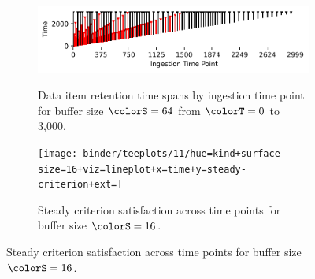 \begin{figure}[h!]
   \begin{minipage}[]{\textwidth}
   \vspace{-2pt}
  \begin{subfigure}[t]{0.7\linewidth}
  \vspace{0pt}
    \centering
    \includegraphics[width=0.88\linewidth,clip]{binder/teeplots/11/num-generations=262144+surface-size=64+viz=stratum-persistence-dripplot+ext=}
  \end{subfigure}%
  \begin{subfigure}[t]{0.3\linewidth}
  \vspace{-2pt}
  \caption{%
    Data item retention time spans by ingestion time point for buffer size $\colorS=64$ from $\colorT=0$ to 3,000.
  }
  \label{fig:hsurf-steady-implementation-dripplot}
  \end{subfigure}
  \end{minipage}

 \begin{minipage}[]{\textwidth}
 \vspace{-2pt}
\begin{subfigure}[t]{0.7\linewidth}
\vspace{0pt}
  \centering
  \texttt{[image: binder/teeplots/11/hue=kind+surface-size=16+viz=lineplot+x=time+y=steady-criterion+ext=]}
\end{subfigure}%
\begin{subfigure}[t]{0.3\linewidth}
\vspace{-2pt}
\caption{%
  Steady criterion satisfaction across time points for buffer size $\colorS=16$.
}
\label{fig:hsurf-steady-implementation-satisfaction}
\end{subfigure}
\end{minipage}


\end{figure}
